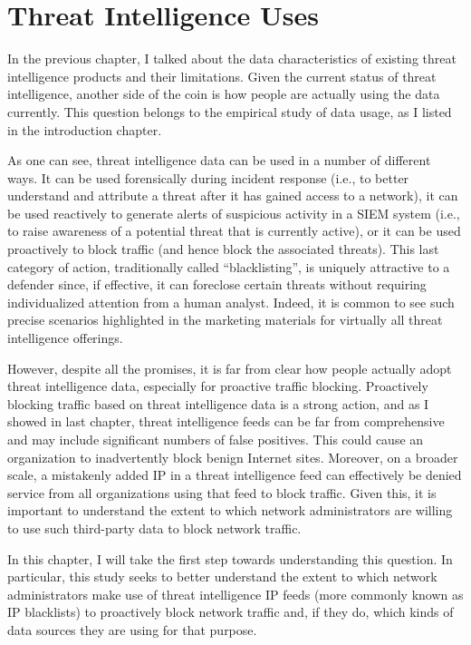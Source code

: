 \chapter{Threat Intelligence Uses}
\label{chapter:data_usage}

In the previous chapter, I talked about the data characteristics of 
existing threat intelligence products and their limitations. Given
the current status of threat intelligence, another side of the coin is
how people are actually using the data currently. This question belongs 
to the empirical study of data usage, as I listed in the 
introduction chapter.

As one can see, threat intelligence data can be used in a number
of different ways. It can be used forensically during incident response
(i.e., to better understand and attribute a threat after it has gained
access to a network), it can be used reactively to generate alerts
of suspicious activity in a SIEM system 
(i.e., to raise awareness of a potential threat
that is currently active), or it can be used proactively to block
traffic (and hence block the associated threats). This last category
of action, traditionally called ``blacklisting'', is uniquely
attractive to a defender since, if effective, it can foreclose certain
threats without requiring individualized attention from a human
analyst. Indeed, it is common to see such precise scenarios
highlighted in the marketing materials for virtually all threat
intelligence offerings.

However, despite all the promises, it is far from clear how people 
actually adopt threat intelligence data, especially for proactive
traffic blocking. Proactively blocking traffic based on threat 
intelligence data is a strong action, and as I showed in last chapter,
threat intelligence feeds can be far from comprehensive and may include
significant numbers of false positives. This could cause an organization
to inadvertently block benign Internet sites. Moreover, on a broader 
scale, a mistakenly added IP in a threat intelligence feed can
effectively be denied service from all organizations using that feed
to block traffic. Given this, it is important to understand the extent
to which network administrators are willing to use such third-party data 
to block network traffic.

In this chapter, I will take the first step towards understanding this
question. In particular, this study seeks to better understand the extent 
to which network administrators make use of threat intelligence IP feeds
(more commonly known as IP blacklists) to proactively block network 
traffic and, if they do, which kinds of data sources they are using for 
that purpose.

